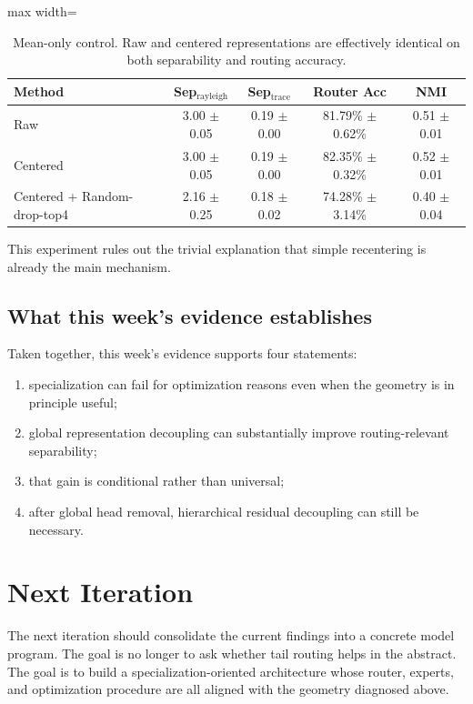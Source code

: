 \documentclass[11pt]{article}
\newcommand{\tablesize}{\footnotesize}
\begin{document}
\begin{table}[H]
\centering
\tablesize
\begin{adjustbox}{max width=\linewidth}
\begin{tabular}{lcccc}
\toprule
Method & Sep$_{\text{rayleigh}}$ & Sep$_{\text{trace}}$ & Router Acc & NMI \\
\midrule
Raw & 3.00 $\pm$ 0.05 & 0.19 $\pm$ 0.00 & 81.79\% $\pm$ 0.62\% & 0.51 $\pm$ 0.01 \\
Centered & 3.00 $\pm$ 0.05 & 0.19 $\pm$ 0.00 & 82.35\% $\pm$ 0.32\% & 0.52 $\pm$ 0.01 \\
Centered + Random-drop-top4 & 2.16 $\pm$ 0.25 & 0.18 $\pm$ 0.02 & 74.28\% $\pm$ 3.14\% & 0.40 $\pm$ 0.04 \\
\bottomrule
\end{tabular}
\end{adjustbox}
\caption{Mean-only control. Raw and centered representations are effectively identical on both separability and routing accuracy.}
\label{tab:exp-a}
\end{table}

This experiment rules out the trivial explanation that simple recentering is already the main mechanism.

\subsection{What this week's evidence establishes}

Taken together, this week's evidence supports four statements:
\begin{enumerate}[leftmargin=1.5em]
    \item specialization can fail for optimization reasons even when the geometry is in principle useful;
    \item global representation decoupling can substantially improve routing-relevant separability;
    \item that gain is conditional rather than universal;
    \item after global head removal, hierarchical residual decoupling can still be necessary.
\end{enumerate}

\section{Next Iteration}

The next iteration should consolidate the current findings into a concrete model program. The goal is no longer to ask whether tail routing helps in the abstract. The goal is to build a specialization-oriented architecture whose router, experts, and optimization procedure are all aligned with the geometry diagnosed above.
\end{document}
